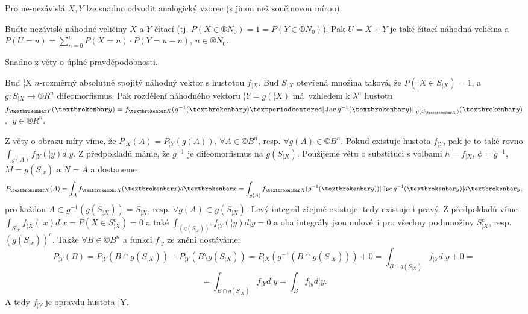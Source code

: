 \documentclass[12pt]{article}					%
\begin{document}
\begin{poznamka}
	Pro ne-nezávislá $X, Y$ lze snadno odvodit analogický vzorec (s jinou než součinovou mírou).
\end{poznamka}

\begin{veta}
	Buďte nezávislé náhodné veličiny $X$ a $Y$ čítací (tj. $P(X \in ®N_0) = 1 = P(Y \in ®N_0)$). Pak $U = X + Y$ je také čítací náhodná veličina a $P(U = u) = \sum_{n=0}^u P(X = n)·P(Y = u - n)$, $u \in ®N_0$.

	\begin{dukazin}
		Snadno z věty o úplné pravděpodobnosti.
	\end{dukazin}
\end{veta}

\begin{veta}
	Buď ¦X $n$-rozměrný absolutně spojitý náhodný vektor s hustotou $f_{¦X}$. Buď $S_{¦X}$ otevřená množina taková, že $P(¦X \in S_{¦X}) = 1$, a $g: S_{¦X} \rightarrow ®R^n$ difeomorfismus. Pak rozdělení náhodného vektoru $¦Y = g(¦X)$ má vzhledem k $\lambda^n$ hustotu $f_{¦Y}(¦y) = f_{¦X}(g^{-1}(¦y) · |\Jac g^{-1}(¦y)| !_{g(S_{¦X})}(¦y)$, $¦y \in ®R^n$.

	\begin{dukazin}
		Z věty o obrazu míry víme, že $P_{¦X}(A) = P_{¦Y}(g(A))$, $\forall A \in ©B^n$, resp. $\forall g(A) \in ©B^n$. Pokud existuje hustota $f_{¦Y}$, pak je to také rovno $\int_{g(A)} f_{¦Y}(¦y) d¦y$. Z předpokladů máme, že $g^{-1}$ je difeomorfismus na $g(S_{¦X})$. Použijeme větu o substituci s volbami $h = f_{¦X}$, $\phi = g^{-1}$, $M = g(S_{¦x})$ a $N = A$ a dostaneme
		$$ P_{¦X}(A) = \int_A f_{¦X}(¦x) d¦x = \int_{g(A)} f_{¦X}(g^{-1}(¦y)) |\Jac g^{-1}(¦y)| d¦y, $$
		pro každou $A \subset g^{-1}(g(S_{¦X})) = S_{¦X}$, resp. $\forall g(A) \subset g(S_{¦X})$. Levý integrál zřejmě existuje, tedy existuje i pravý. Z předpokladů víme $\int_{S_{¦X}^c} f_{¦X}(¦x) d¦x = P(X \in S_{¦X}^c) = 0$ a také $\int_{(g(S_{¦x}))^c} f_{¦Y}(¦y) d¦y = 0$ a oba integrály jsou nulové i pro všechny podmnožiny $S_{¦X}^c$, resp. $(g(S_{¦x}))^c$. Takže $\forall B \in ©B^n$ a funkci $f_{¦y}$ ze znění dostáváme:
		$$ P_{¦Y}(B) = P_{¦Y}(B \cap g(S_{¦X})) + P_{¦Y}(B \setminus g(S_{¦X})) = P_{¦X}(g^{-1}(B \cap g(S_{¦X}))) + 0 = \int_{B \cap g(S_{¦X})} f_{¦Y} d¦y + 0 = $$
		$$ = \int_{B \cap g(S_{¦X})} f_{¦Y} d¦y = \int_B f_{¦y} d¦y. $$
		A tedy $f_{¦Y}$ je opravdu hustota ¦Y.
	\end{dukazin}
\end{veta}
\end{document}
